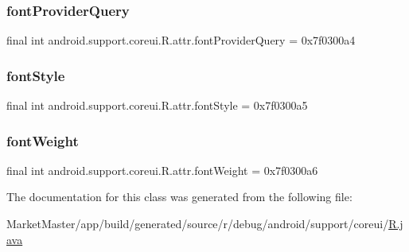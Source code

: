 \subsubsection{\texorpdfstring{font\+Provider\+Query}{fontProviderQuery}}
{\footnotesize\ttfamily final int android.\+support.\+coreui.\+R.\+attr.\+font\+Provider\+Query = 0x7f0300a4\hspace{0.3cm}{\ttfamily [static]}}

\mbox{\label{classandroid_1_1support_1_1coreui_1_1R_1_1attr_a7b8d9c04303e3b683bdb2c3be641078b}} 
\subsubsection{\texorpdfstring{font\+Style}{fontStyle}}
{\footnotesize\ttfamily final int android.\+support.\+coreui.\+R.\+attr.\+font\+Style = 0x7f0300a5\hspace{0.3cm}{\ttfamily [static]}}

\mbox{\label{classandroid_1_1support_1_1coreui_1_1R_1_1attr_a581f6ee3bb01d0235ac62a192ac890fb}} 
\subsubsection{\texorpdfstring{font\+Weight}{fontWeight}}
{\footnotesize\ttfamily final int android.\+support.\+coreui.\+R.\+attr.\+font\+Weight = 0x7f0300a6\hspace{0.3cm}{\ttfamily [static]}}



The documentation for this class was generated from the following file\+:\begin{DoxyCompactItemize}
\item 
Market\+Master/app/build/generated/source/r/debug/android/support/coreui/\mbox{\hyperlink{debug_2android_2support_2coreui_2R_8java}{R.\+java}}\end{DoxyCompactItemize}
